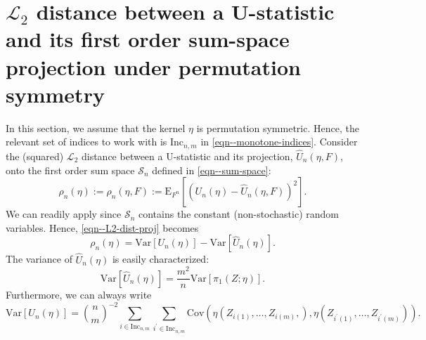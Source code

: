 \documentclass[12pt]{article}
\numberwithin{equation}{section}
\theoremstyle{definition}
\theoremstyle{plain}
\begin{document}
\section{\texorpdfstring{\(\mathscr{L}_{2}\)}{L2} distance between a U-statistic
and its first order sum-space projection under permutation symmetry}

In this section, we assume that the kernel \(\eta\) is permutation symmetric.
Hence, the relevant set of indices to work with is \(\mathrm{Inc}_{n, m}\)
in \eqref{eqn--monotone-indices}.
Consider the (squared) \(\mathscr{L}_{2}\) distance between a U-statistic and
its projection, \(\widehat{U}_{n} (\eta, F)\), onto the first order sum space
\(\mathcal{S}_{n}\) defined in
\eqref{eqn--sum-space}:
\begin{equation}
  \rho_{n} (\eta) := \rho_{n} (\eta, F) := \mathrm{E}_{F^{n}} \left[
  \left( U_{n} (\eta) - \widehat{U}_{n} (\eta, F) \right)^{2} \right].
  \label{eqn--L2-dist-proj}
\end{equation}
We can readily apply  since
\(\mathcal{S}_{n}\) contains the constant (non-stochastic) random
variables.
Hence, \eqref{eqn--L2-dist-proj} becomes
\begin{equation}
  \rho_{n} (\eta) = \mathrm{Var} \left[ U_{n} (\eta) \right] - \mathrm{Var}
  \left[ \widehat{U}_{n} (\eta) \right].
  \label{eqn--Ustat-proj-L2-dist-as-dif-of-vars}
\end{equation}
The variance of \(\widehat{U}_{n} (\eta)\) is easily characterized:
\begin{equation}
  \mathrm{Var} \left[ \widehat{U}_{n} (\eta) \right] = \frac{m^{2}}{n}
  \mathrm{Var} \left[ \pi_{1} (Z; \eta) \right].
  \label{eqn--Uhat-var-1}
\end{equation}
Furthermore, we can always write
\begin{equation}
  \mathrm{Var} \left[ U_{n} (\eta) \right] = \binom{n}{m}^{- 2} \sum_{i \in
  \mathrm{Inc}_{n, m}} \sum_{i^{\prime} \in \mathrm{Inc}_{n, m}}
  \mathrm{Cov} \left( \eta \left( Z_{i (1)}, \dots, Z_{i (m)}, \right), \eta
  \left( Z_{i^{\prime} (1)}, \dots, Z_{i^{\prime} (m)} \right) \right).
  \label{eqn--Ustat-var-1}
\end{equation}
\end{document}

